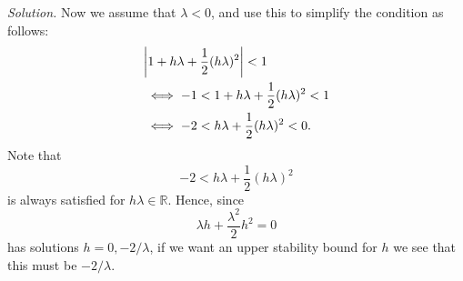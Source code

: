 \documentclass{article}
\newcommand{\R}{\mathbb{R}}
\begin{document}
\textit{Solution.}
Now we assume that $\lambda < 0$, and use this to simplify the condition
as follows:
%
\begin{align*}
    &\envert{1 + h \lambda + \frac{1}{2} (h \lambda)^2} < 1
    \\
    &\iff -1 < 1 + h \lambda + \frac{1}{2} (h \lambda)^2 < 1
    \\
    &\iff -2 < h \lambda + \frac{1}{2} (h \lambda)^2 < 0
    .
\end{align*}
%
Note that
%
\begin{equation*}
    -2 < h \lambda + \frac{1}{2} (h \lambda)^2
\end{equation*}
%
is always satisfied for $h \lambda \in \R$.
Hence, since 
%
\begin{equation*}
    \lambda h + \frac{\lambda^2}{2} h^2 = 0
\end{equation*}
%
has solutions $h = 0, -2/\lambda$, if we want an upper stability bound for $h$
we see that this must be $-2/\lambda$.
\end{document}
